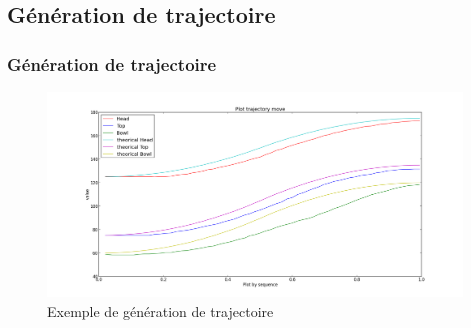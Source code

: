 \subsection{Génération de trajectoire}
\begin{frame}
  \frametitle{Génération de trajectoire}
            \begin{figure}
                \begin{center}
                    \includegraphics[width=11cm]{../img/TrajectoryPlot.png}
                \end{center}
                \caption{Exemple de génération de trajectoire}
            \end{figure}
\end{frame}
